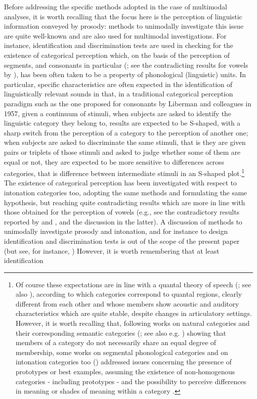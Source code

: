 \documentclass[output=paper]{langsci/langscibook}
\begin{document}
Before addressing the specific methods adopted in the case of multimodal analyses, it is worth recalling that the focus here is the perception of linguistic information conveyed by prosody: methods to unimodally investigate this issue are quite well-known and are also used for multimodal investigations. For instance, identification and discrimination tests are used in checking for the existence of categorical perception which, on the basis of the perception of segments, and consonants in particular (\citealt{Liberman1957}; see the contradicting results for vowels by \citealt{FryDB1962}), has been often taken to be a property of phonological (linguistic) units. In particular, specific characteristics are often expected in the identification of linguistically relevant sounds in that, in a traditional categorical perception paradigm such as the one proposed for consonants by Liberman and colleagues in 1957, given a continuum of stimuli, when subjects are asked to identify the linguistic category they belong to, results are expected to be S-shaped, with a sharp switch from the perception of a category to the perception of another one; when subjects are asked to discriminate the same stimuli, that is they are given pairs or triplets of those stimuli and asked to judge whether some of them are equal or not, they are expected to be more sensitive to differences across categories, that is difference between intermediate stimuli in an S-shaped plot.\footnote{Of course these expectations are in line with a quantal theory of speech (\citealt{Stevens1972,Stevens1989}; see also \citealt{Stevens2010}), according to which categories correspond to quantal regions, clearly different from each other and whose members show acoustic and auditory characteristics which are quite stable, despite changes in articulatory settings. However, it is worth recalling that, following works on natural categories and their corresponding semantic categories (\citealt[193]{Rosch1975}; see also e.g. \citealt{Berlin1969}) showing that members of a category do not necessarily share an equal degree of membership, some works on segmental phonological categories \citep{Kuhl1991} and on intonation categories too (\citealt{SchneiderEtAl2006,Schneider2009,GiliFivela2012}) addressed issues concerning the presence of prototypes or best examples, assuming the existence of non-homogenous categories - including prototypes - and the possibility to perceive differences in meaning or shades of meaning within a category \citep{GiliFivela2012}.} The existence of categorical perception has been investigated with respect to intonation categories too, adopting the same methods and formulating the same hypothesis, but reaching quite contradicting results which are more in line with those obtained for the perception of vowels (e.g., see the contradictory results reported by \citealt{Vanrell2006,SchneiderEtAl2006} and \citealt{Niebuhr2004}, and the discussion in the latter). A discussion of methods to unimodally investigate prosody and intonation, and for instance to design identification and discrimination tests is out of the scope of the present paper (but see, for instance, \citealt{Gussenhoven1999discreteness.gradience,Gussenhoven2004,GiliFivela2008book,Prieto.2012}) However, it is worth remembering that at least identification 
\end{document}
